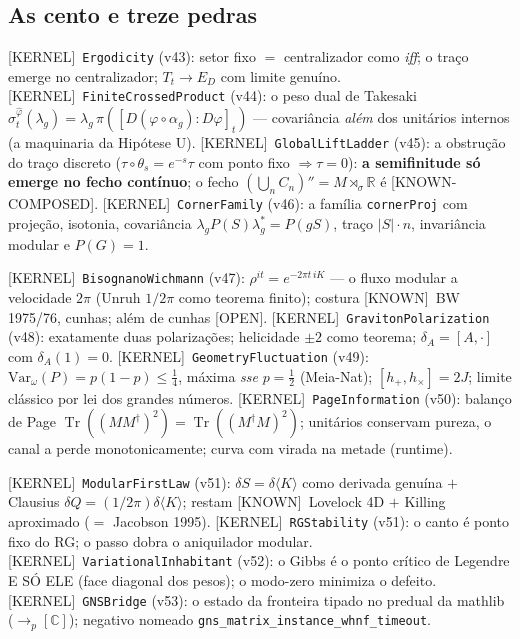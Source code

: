 \documentclass[11pt]{article}
\providecommand{\kernelmk}[1]{\textsf{[KERNEL]}~\texttt{#1}}\providecommand{\knownmk}[1]{\textsf{[KNOWN]}~{#1}}\providecommand{\statusmk}[1]{\textsf{[#1]}}
\theoremstyle{definition}\newtheorem{deriv}{Derivação}
\begin{document}
\subsection*{As cento e treze pedras}

\kernelmk{Ergodicity} (v43): setor fixo $=$ centralizador como \emph{iff}; o traço emerge no centralizador; $T_t\to E_D$ com limite genuíno. \kernelmk{FiniteCrossedProduct} (v44): o peso dual de Takesaki $\sigma^{\hat\varphi}_t(\lambda_g)=\lambda_g\,\pi([D(\varphi\circ\alpha_g):D\varphi]_t)$ --- covariância \emph{além} dos unitários internos (a maquinaria da Hipótese U). \kernelmk{GlobalLiftLadder} (v45): a obstrução do traço discreto ($\tau\circ\theta_s=e^{-s}\tau$ com ponto fixo $\Rightarrow\tau=0$): \textbf{a semifinitude só emerge no fecho contínuo}; o fecho $(\bigcup_n C_n)''=M\rtimes_\sigma\mathbb{R}$ é \statusmk{KNOWN-COMPOSED}. \kernelmk{CornerFamily} (v46): a família \texttt{cornerProj} com projeção, isotonia, covariância $\lambda_g P(S)\lambda_g^*=P(gS)$, traço $|S|\cdot n$, invariância modular e $P(G)=1$.

\kernelmk{BisognanoWichmann} (v47): $\rho^{it}=e^{-2\pi t\,iK}$ --- o fluxo modular a velocidade $2\pi$ (Unruh $1/2\pi$ como teorema finito); costura \knownmk{BW 1975/76, cunhas}; além de cunhas \statusmk{OPEN}. \kernelmk{GravitonPolarization} (v48): exatamente duas polarizações; helicidade $\pm2$ como teorema; $\delta_A=[A,\cdot]$ com $\delta_A(1)=0$. \kernelmk{GeometryFluctuation} (v49): $\mathrm{Var}_\omega(P)=p(1-p)\le\tfrac14$, máxima \emph{sse} $p=\tfrac12$ (Meia-Nat); $[h_+,h_\times]=2J$; limite clássico por lei dos grandes números. \kernelmk{PageInformation} (v50): balanço de Page $\operatorname{Tr}((MM^\dagger)^2)=\operatorname{Tr}((M^\dagger M)^2)$; unitários conservam pureza, o canal a perde monotonicamente; curva com virada na metade (runtime).

\kernelmk{ModularFirstLaw} (v51): $\delta S=\delta\langle K\rangle$ como derivada genuína $+$ Clausius $\delta Q=(1/2\pi)\delta\langle K\rangle$; restam \knownmk{Lovelock 4D} $+$ Killing aproximado ($=$ Jacobson 1995). \kernelmk{RGStability} (v51): o canto é ponto fixo do RG; o passo dobra o aniquilador modular. \kernelmk{VariationalInhabitant} (v52): o Gibbs é o ponto crítico de Legendre E SÓ ELE (face diagonal dos pesos); o modo-zero minimiza o defeito. \kernelmk{GNSBridge} (v53): o estado da fronteira tipado no predual da mathlib ($\to_{\!p}[\mathbb{C}]$); negativo nomeado \texttt{gns\_matrix\_instance\_whnf\_timeout}.
\end{document}
